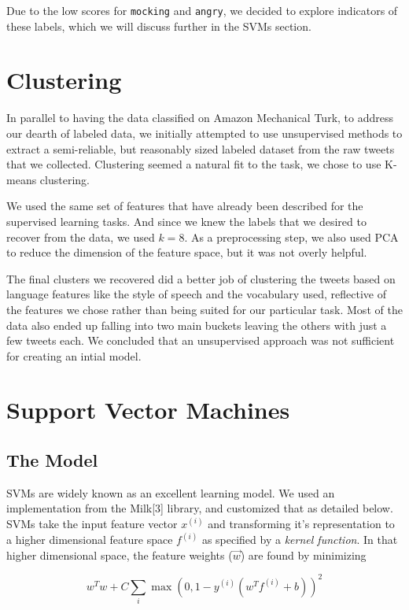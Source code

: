 \documentclass[11pt]{article}
\begin{document}
Due to the low scores for \verb|mocking| and \verb|angry|, we decided to explore indicators of these labels, which we will discuss further in the SVMs section. 

\section{Clustering}

In parallel to having the data classified on Amazon Mechanical Turk, to address our dearth of labeled data, we initially attempted to use unsupervised methods to extract a semi-reliable, but reasonably sized labeled dataset from the raw tweets that we collected. Clustering seemed a natural fit to the task, we chose to use K-means clustering.

We used the same set of features that have already been described for the supervised learning tasks. And since we knew the labels that we desired to recover from the data, we used $k = 8$. As a preprocessing step, we also used PCA to reduce the dimension of the feature space, but it was not overly helpful.

The final clusters we recovered did a better job of clustering the tweets based on language features like the style of speech and the vocabulary used, reflective of the features we chose rather than being suited for our particular task. Most of the data also ended up falling into two main buckets leaving the others with just a few tweets each. We concluded that an unsupervised approach was not sufficient for creating an intial model.

\section{Support Vector Machines}

\subsection{The Model}

SVMs are widely known as an excellent learning model. We used an implementation from the Milk[3] library, and customized that as detailed below. SVMs take the input feature vector $x^{(i)}$ and transforming it's representation to a higher dimensional feature space $f^{(i)}$ as specified by a \emph{kernel function}. In that higher dimensional space, the feature weights ($\vec{w}$) are found by minimizing

\begin{equation}
w^T w + C \sum_i{\max (0, 1-y^{(i)}(w^T f^{(i)} + b))^2}
\end{equation}
\end{document}

